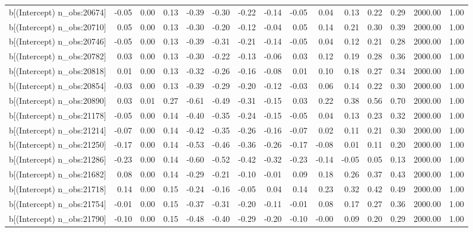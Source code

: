 \begin{table}[ht]
\begin{tabular}{rrrrrrrrrrrrrrr}
  b[(Intercept) n\_obs:20674] & -0.05 & 0.00 & 0.13 & -0.39 & -0.30 & -0.22 & -0.14 & -0.05 & 0.04 & 0.13 & 0.22 & 0.29 & 2000.00 & 1.00 \\ 
  b[(Intercept) n\_obs:20710] & 0.05 & 0.00 & 0.13 & -0.30 & -0.20 & -0.12 & -0.04 & 0.05 & 0.14 & 0.21 & 0.30 & 0.39 & 2000.00 & 1.00 \\ 
  b[(Intercept) n\_obs:20746] & -0.05 & 0.00 & 0.13 & -0.39 & -0.31 & -0.21 & -0.14 & -0.05 & 0.04 & 0.12 & 0.21 & 0.28 & 2000.00 & 1.00 \\ 
  b[(Intercept) n\_obs:20782] & 0.03 & 0.00 & 0.13 & -0.30 & -0.22 & -0.13 & -0.06 & 0.03 & 0.12 & 0.19 & 0.28 & 0.36 & 2000.00 & 1.00 \\ 
  b[(Intercept) n\_obs:20818] & 0.01 & 0.00 & 0.13 & -0.32 & -0.26 & -0.16 & -0.08 & 0.01 & 0.10 & 0.18 & 0.27 & 0.34 & 2000.00 & 1.00 \\ 
  b[(Intercept) n\_obs:20854] & -0.03 & 0.00 & 0.13 & -0.39 & -0.29 & -0.20 & -0.12 & -0.03 & 0.06 & 0.14 & 0.22 & 0.30 & 2000.00 & 1.00 \\ 
  b[(Intercept) n\_obs:20890] & 0.03 & 0.01 & 0.27 & -0.61 & -0.49 & -0.31 & -0.15 & 0.03 & 0.22 & 0.38 & 0.56 & 0.70 & 2000.00 & 1.00 \\ 
  b[(Intercept) n\_obs:21178] & -0.05 & 0.00 & 0.14 & -0.40 & -0.35 & -0.24 & -0.15 & -0.05 & 0.04 & 0.13 & 0.23 & 0.32 & 2000.00 & 1.00 \\ 
  b[(Intercept) n\_obs:21214] & -0.07 & 0.00 & 0.14 & -0.42 & -0.35 & -0.26 & -0.16 & -0.07 & 0.02 & 0.11 & 0.21 & 0.30 & 2000.00 & 1.00 \\ 
  b[(Intercept) n\_obs:21250] & -0.17 & 0.00 & 0.14 & -0.53 & -0.46 & -0.36 & -0.26 & -0.17 & -0.08 & 0.01 & 0.11 & 0.20 & 2000.00 & 1.00 \\ 
  b[(Intercept) n\_obs:21286] & -0.23 & 0.00 & 0.14 & -0.60 & -0.52 & -0.42 & -0.32 & -0.23 & -0.14 & -0.05 & 0.05 & 0.13 & 2000.00 & 1.00 \\ 
  b[(Intercept) n\_obs:21682] & 0.08 & 0.00 & 0.14 & -0.29 & -0.21 & -0.10 & -0.01 & 0.09 & 0.18 & 0.26 & 0.37 & 0.43 & 2000.00 & 1.00 \\ 
  b[(Intercept) n\_obs:21718] & 0.14 & 0.00 & 0.15 & -0.24 & -0.16 & -0.05 & 0.04 & 0.14 & 0.23 & 0.32 & 0.42 & 0.49 & 2000.00 & 1.00 \\ 
  b[(Intercept) n\_obs:21754] & -0.01 & 0.00 & 0.15 & -0.37 & -0.31 & -0.20 & -0.11 & -0.01 & 0.08 & 0.17 & 0.27 & 0.36 & 2000.00 & 1.00 \\ 
  b[(Intercept) n\_obs:21790] & -0.10 & 0.00 & 0.15 & -0.48 & -0.40 & -0.29 & -0.20 & -0.10 & -0.00 & 0.09 & 0.20 & 0.29 & 2000.00 & 1.00 \\ 

\end{tabular}
\end{table}
